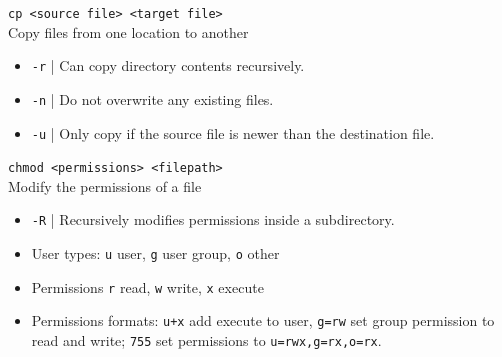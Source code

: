 \documentclass[a4paper,11pt,parskip=half-]{scrartcl}
\begin{document}
\Large \texttt{cp <source file> <target file>} \normalsize \\
Copy files from one location to another
\begin{itemize}
    \item \texttt{-r} | Can copy directory contents recursively.
    \item \texttt{-n} | Do not overwrite any existing files.
    \item \texttt{-u} | Only copy if the source file is newer than the destination file.
\end{itemize}

\Large \texttt{chmod <permissions> <filepath>} \normalsize \\
Modify the permissions of a file
\begin{itemize}
    \item \texttt{-R} | Recursively modifies permissions inside a subdirectory.
    \item User types: \texttt{u} user, \texttt{g} user group, \texttt{o} other
    \item Permissions \texttt{r} read, \texttt{w} write, \texttt{x} execute
    \item Permissions formats: \texttt{u+x} add execute to user, \texttt{g=rw} set group permission to read and write; \texttt{755} set permissions to \texttt{u=rwx,g=rx,o=rx}.
\end{itemize}
\end{document}
